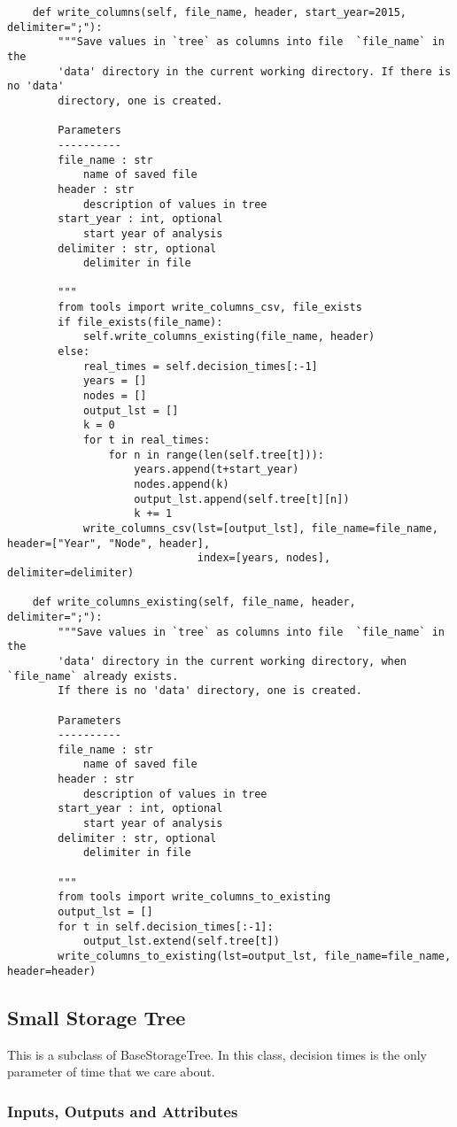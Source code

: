 \documentclass[12pt]{article}
\begin{document}
\begin{verbatim}
	def write_columns(self, file_name, header, start_year=2015, delimiter=";"):
		"""Save values in `tree` as columns into file  `file_name` in the
		'data' directory in the current working directory. If there is no 'data'
		directory, one is created.
		
		Parameters
		----------
		file_name : str
			name of saved file
		header : str
			description of values in tree
		start_year : int, optional
			start year of analysis
		delimiter : str, optional
			delimiter in file

		"""
		from tools import write_columns_csv, file_exists
		if file_exists(file_name):
			self.write_columns_existing(file_name, header)
		else:
			real_times = self.decision_times[:-1]
			years = []
			nodes = []
			output_lst = []
			k = 0
			for t in real_times:
				for n in range(len(self.tree[t])):
					years.append(t+start_year)
					nodes.append(k)
					output_lst.append(self.tree[t][n])
					k += 1
			write_columns_csv(lst=[output_lst], file_name=file_name, header=["Year", "Node", header],
							  index=[years, nodes], delimiter=delimiter)

	def write_columns_existing(self, file_name, header, delimiter=";"):
		"""Save values in `tree` as columns into file  `file_name` in the
		'data' directory in the current working directory, when `file_name` already exists.
		If there is no 'data' directory, one is created.

		Parameters
		----------
		file_name : str
			name of saved file
		header : str
			description of values in tree
		start_year : int, optional
			start year of analysis
		delimiter : str, optional
			delimiter in file

		"""
		from tools import write_columns_to_existing
		output_lst = []
		for t in self.decision_times[:-1]:
			output_lst.extend(self.tree[t])
		write_columns_to_existing(lst=output_lst, file_name=file_name, header=header)
\end{verbatim}





\subsection{Small Storage Tree}
This is a subclass of BaseStorageTree. In this class, decision times is the only parameter of time that we care about.
\subsubsection{Inputs, Outputs and Attributes}
\end{document}
